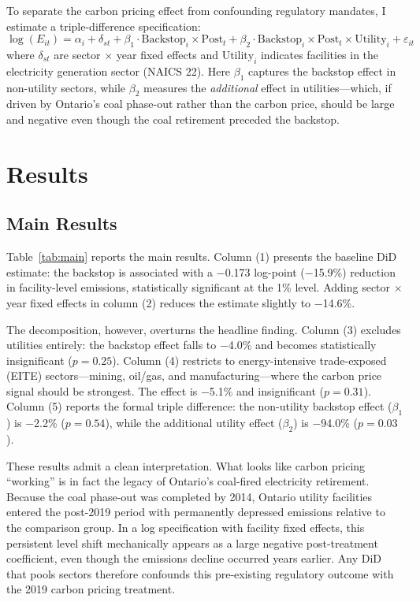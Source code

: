 \documentclass[12pt]{article}
\begin{document}
To separate the carbon pricing effect from confounding regulatory mandates, I estimate a triple-difference specification:
\begin{equation}\label{eq:ddd}
    \log(E_{it}) = \alpha_i + \delta_{st} + \beta_1 \cdot \text{Backstop}_i \times \text{Post}_t + \beta_2 \cdot \text{Backstop}_i \times \text{Post}_t \times \text{Utility}_i + \varepsilon_{it}
\end{equation}
where $\delta_{st}$ are sector $\times$ year fixed effects and $\text{Utility}_i$ indicates facilities in the electricity generation sector (NAICS 22). Here $\beta_1$ captures the backstop effect in non-utility sectors, while $\beta_2$ measures the \textit{additional} effect in utilities---which, if driven by Ontario's coal phase-out rather than the carbon price, should be large and negative even though the coal retirement preceded the backstop.


\section{Results}

\subsection{Main Results}



Table~\ref{tab:main} reports the main results. Column (1) presents the baseline DiD estimate: the backstop is associated with a $-$0.173 log-point ($-$15.9\%) reduction in facility-level emissions, statistically significant at the 1\% level. Adding sector $\times$ year fixed effects in column (2) reduces the estimate slightly to $-$14.6\%.

The decomposition, however, overturns the headline finding. Column (3) excludes utilities entirely: the backstop effect falls to $-$4.0\% and becomes statistically insignificant ($p = 0.25$). Column (4) restricts to energy-intensive trade-exposed (EITE) sectors---mining, oil/gas, and manufacturing---where the carbon price signal should be strongest. The effect is $-$5.1\% and insignificant ($p = 0.31$). Column (5) reports the formal triple difference: the non-utility backstop effect ($\beta_1$) is $-$2.2\% ($p = 0.54$), while the additional utility effect ($\beta_2$) is $-$94.0\% ($p = 0.03$).

These results admit a clean interpretation. What looks like carbon pricing ``working'' is in fact the legacy of Ontario's coal-fired electricity retirement. Because the coal phase-out was completed by 2014, Ontario utility facilities entered the post-2019 period with permanently depressed emissions relative to the comparison group. In a log specification with facility fixed effects, this persistent level shift mechanically appears as a large negative post-treatment coefficient, even though the emissions decline occurred years earlier. Any DiD that pools sectors therefore confounds this pre-existing regulatory outcome with the 2019 carbon pricing treatment.
\end{document}
